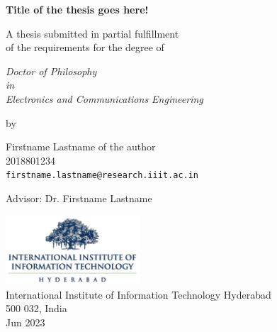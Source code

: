 \thispagestyle{empty}
\begin{center}
\vspace*{1.5cm}
{\Large \bf Title of the thesis goes here!}

\vspace*{2.2cm}
{\large A thesis submitted in partial fulfillment\\}
{\large  of the requirements for the degree of \\}

\vspace*{1cm}
{\it {\large Doctor of Philosophy } \\
{\large in\\}
{\large Electronics and Communications Engineering \\}}

\vspace*{0.8cm}
{\large by}

\vspace*{6mm}
{\large Firstname Lastname of the author\\}
{\large 2018801234\\
{\small \tt firstname.lastname@research.iiit.ac.in}}

\vspace*{5mm}
{\large Advisor: Dr. Firstname Lastname\\}


\vspace*{3.0cm}
{\includegraphics[width=5cm]{figures/iiit.png}\\}
{\large International Institute of Information Technology Hyderabad\\}
{\large 500 032, India\\}
\vspace*{5mm}
{\large Jun 2023\\}
\end{center}